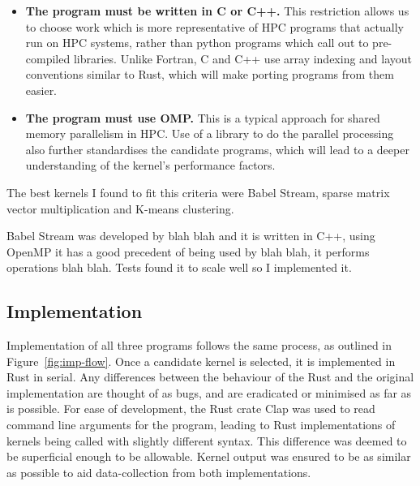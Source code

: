 \begin{itemize}
  \item \textbf{The program must be written in C or C++.} This restriction allows us to choose work which is more representative of HPC programs that actually run on HPC systems, rather than python programs which call out to pre-compiled libraries. Unlike Fortran, C and C++ use array indexing and layout conventions similar to Rust, which will make porting programs from them easier.

  \item \textbf{The program must use OMP.} This is a typical approach for shared memory parallelism in HPC. Use of a library to do the parallel processing also further standardises the candidate programs, which will lead to a deeper understanding of the kernel's performance factors.
\end{itemize}

The best kernels I found to fit this criteria were Babel Stream, sparse matrix vector multiplication and K-means clustering.

Babel Stream was developed by blah blah and it is written in C++, using OpenMP it has a good precedent of being used by blah blah, it performs operations blah blah. Tests found it to scale well so I implemented it.

\subsection{Implementation}
Implementation of all three programs follows the same process, as outlined in Figure~\ref{fig:imp-flow}. Once a candidate kernel is selected, it is implemented in Rust in serial. Any differences between the  behaviour of the Rust and the original implementation are thought of as bugs, and are eradicated or minimised as far as is possible. For ease of development, the Rust crate Clap was used to read command line arguments for the program, leading to Rust implementations of kernels being called with slightly different syntax. This difference was deemed to be superficial enough to be allowable. Kernel output was ensured to be as similar as possible to aid data-collection from both implementations.

